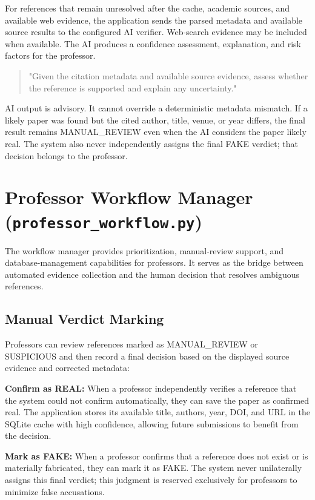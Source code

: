 \documentclass[12pt,a4paper,oneside]{report}
\begin{document}
For references that remain unresolved after the cache, academic sources, and available web evidence, the application sends the parsed metadata and available source results to the configured AI verifier. Web-search evidence may be included when available. The AI produces a confidence assessment, explanation, and risk factors for the professor.

\begin{quote}
"Given the citation metadata and available source evidence, assess whether the reference is supported and explain any uncertainty."
\end{quote}

AI output is advisory. It cannot override a deterministic metadata mismatch. If a likely paper was found but the cited author, title, venue, or year differs, the final result remains MANUAL\_REVIEW even when the AI considers the paper likely real. The system also never independently assigns the final FAKE verdict; that decision belongs to the professor.



\section{Professor Workflow Manager (\texttt{professor\_workflow.py})}

The workflow manager provides prioritization, manual-review support, and database-management capabilities for professors. It serves as the bridge between automated evidence collection and the human decision that resolves ambiguous references.

\subsection{Manual Verdict Marking}

Professors can review references marked as MANUAL\_REVIEW or SUSPICIOUS and then record a final decision based on the displayed source evidence and corrected metadata:

\textbf{Confirm as REAL:} When a professor independently verifies a reference that the system could not confirm automatically, they can save the paper as confirmed real. The application stores its available title, authors, year, DOI, and URL in the SQLite cache with high confidence, allowing future submissions to benefit from the decision.

\textbf{Mark as FAKE:} When a professor confirms that a reference does not exist or is materially fabricated, they can mark it as FAKE. The system never unilaterally assigns this final verdict; this judgment is reserved exclusively for professors to minimize false accusations.
\end{document}
